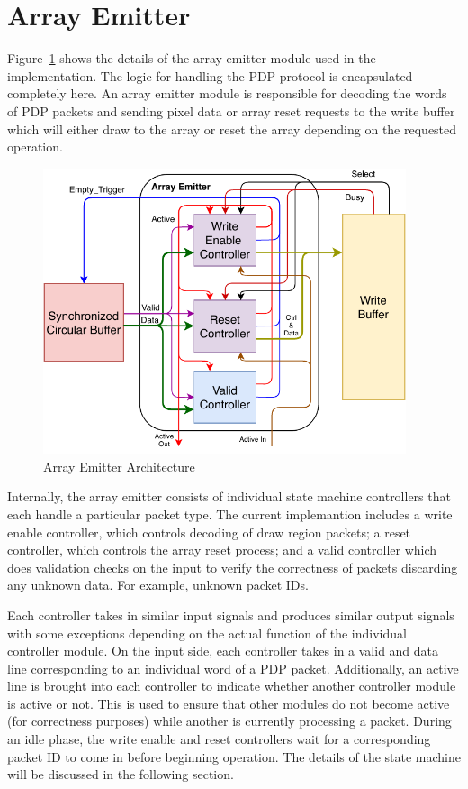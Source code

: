 
\section{Array Emitter}

    Figure~\ref{fig:ae_arch} shows the details of the array emitter module used in the implementation. The logic for handling the PDP protocol is encapsulated completely here. An array emitter module is responsible for decoding the words of PDP packets and sending pixel data or array reset requests to the write buffer which will either draw to the array or reset the array depending on the requested operation.

    \begin{figure}[t]
        \centering
        \includegraphics[width=0.95\textwidth]{fig/pdp_ae_arch.pdf}
        \caption{Array Emitter Architecture}
        \label{fig:ae_arch}
    \end{figure}

    Internally, the array emitter consists of individual state machine controllers that each handle a particular packet type. The current implemantion includes a write enable controller, which controls decoding of draw region packets; a reset controller, which controls the array reset process; and a valid controller which does validation checks on the input to verify the correctness of packets discarding any unknown data. For example, unknown packet IDs.

    Each controller takes in similar input signals and produces similar output signals with some exceptions depending on the actual function of the individual controller module. On the input side, each controller takes in a valid and data line corresponding to an individual word of a PDP packet. Additionally, an active line is brought into each controller to indicate whether another controller module is active or not. This is used to ensure that other modules do not become active (for correctness purposes) while another is currently processing a packet. During an idle phase, the write enable and reset controllers wait for a corresponding packet ID to come in before beginning operation. The details of the state machine will be discussed in the following section.

